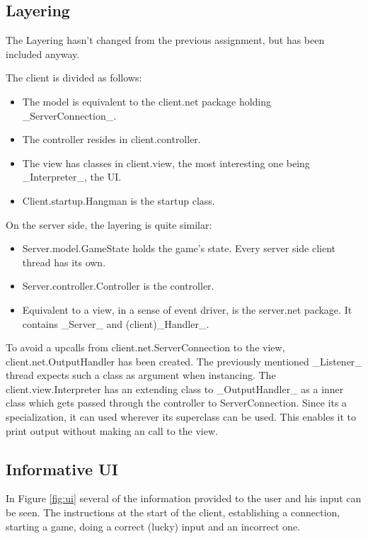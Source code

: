 \documentclass[a4paper]{scrartcl}
\begin{document}
\subsection{Layering}
The Layering hasn't changed from the previous assignment, but has been included anyway.

The client is divided as follows:
\begin{itemize}
    \item The model is equivalent to the client.net package holding _ServerConnection_.
    \item The controller resides in client.controller.
    \item The view has classes in client.view, the most interesting one being _Interpreter_, the UI.
    \item Client.startup.Hangman is the startup class.
\end{itemize}

On the server side, the layering is quite similar:
\begin{itemize}
    \item Server.model.GameState holds the game's state. Every server side client thread has its own.
    \item Server.controller.Controller is the controller.
    \item Equivalent to a view, in a sense of event driver, is the server.net package.
    It contains _Server_ and (client)_Handler_.
\end{itemize}

To avoid a upcalls from client.net.ServerConnection to the view, client.net.OutputHandler has been created.
The previously mentioned _Listener_ thread expects such a class as argument when instancing.
The client.view.Interpreter has an extending class to _OutputHandler_ as a inner class which gets passed through the controller to ServerConnection.
Since its a specialization, it can used wherever its superclass can be used.
This enables it to print output without making an call to the view.

\subsection{Informative UI}
In Figure \ref{fig:ui} several of the information provided to the user and his input can be seen.
The instructions at the start of the client, establishing a connection, starting a game, doing a correct (lucky) input and an incorrect one.
\end{document}
